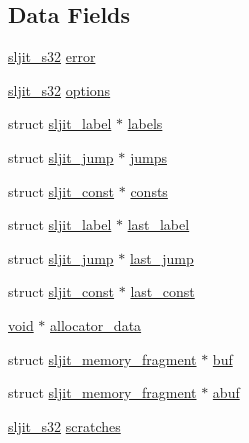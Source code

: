 \subsection*{Data Fields}
\begin{DoxyCompactItemize}
\item 
\hyperlink{sljitConfigInternal_8h_a6a4056383df1600129edb9499b41fadb}{sljit\+\_\+s32} \hyperlink{structsljit__compiler_a77f9d1b9f625e0dc0bd6da66dc843a77}{error}
\item 
\hyperlink{sljitConfigInternal_8h_a6a4056383df1600129edb9499b41fadb}{sljit\+\_\+s32} \hyperlink{structsljit__compiler_af52d1f016c3fc519649080594910ceed}{options}
\item 
struct \hyperlink{structsljit__label}{sljit\+\_\+label} $\ast$ \hyperlink{structsljit__compiler_aecb528ffcd85b281b5634f155058e06a}{labels}
\item 
struct \hyperlink{structsljit__jump}{sljit\+\_\+jump} $\ast$ \hyperlink{structsljit__compiler_a658ae1712ac108d4793b426a7347fa74}{jumps}
\item 
struct \hyperlink{structsljit__const}{sljit\+\_\+const} $\ast$ \hyperlink{structsljit__compiler_a1d7b665f3d4d6997415470f231ba1cfe}{consts}
\item 
struct \hyperlink{structsljit__label}{sljit\+\_\+label} $\ast$ \hyperlink{structsljit__compiler_a9b0d641dc2050d5cf4dab5d0a3deaa66}{last\+\_\+label}
\item 
struct \hyperlink{structsljit__jump}{sljit\+\_\+jump} $\ast$ \hyperlink{structsljit__compiler_a000d3ed85b45ad97d5522ab910c6b45b}{last\+\_\+jump}
\item 
struct \hyperlink{structsljit__const}{sljit\+\_\+const} $\ast$ \hyperlink{structsljit__compiler_a44308b6ac96bf3d2cadc0192c7870bf1}{last\+\_\+const}
\item 
\hyperlink{group__MOD__ISAPI_gacd6cdbf73df3d9eed42fa493d9b621a6}{void} $\ast$ \hyperlink{structsljit__compiler_a52d57da7b63d66fe2323e4c1749116e4}{allocator\+\_\+data}
\item 
struct \hyperlink{structsljit__memory__fragment}{sljit\+\_\+memory\+\_\+fragment} $\ast$ \hyperlink{structsljit__compiler_aac9f0e0e27980257c9b217c11bca66cc}{buf}
\item 
struct \hyperlink{structsljit__memory__fragment}{sljit\+\_\+memory\+\_\+fragment} $\ast$ \hyperlink{structsljit__compiler_a9d726f3f98dee6799586e0470038e115}{abuf}
\item 
\hyperlink{sljitConfigInternal_8h_a6a4056383df1600129edb9499b41fadb}{sljit\+\_\+s32} \hyperlink{structsljit__compiler_aadc0dcd427eb8c70e7c9ca9591d45ec2}{scratches}

\end{DoxyCompactItemize}
